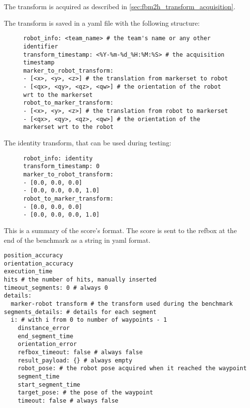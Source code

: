 \documentclass[a4paper]{article}
\begin{document}
The transform is acquired as described in \ref{sec:fbm2h_transform_acquisition}.

The transform is saved in a yaml file with the following structure:


\begin{figure}[h!]
	\noindent
	\begin{minipage}[t!]{\linewidth}
		\begin{lstlisting}[caption=transform-<team_name>.yaml]
robot_info: <team_name> # the team's name or any other identifier
transform_timestamp: <%Y-%m-%d_%H:%M:%S> # the acquisition timestamp
marker_to_robot_transform:
- [<x>, <y>, <z>] # the translation from markerset to robot
- [<qx>, <qy>, <qz>, <qw>] # the orientation of the robot wrt to the markerset
robot_to_marker_transform:
- [<x>, <y>, <z>] # the translation from robot to markerset
- [<qx>, <qy>, <qz>, <qw>] # the orientation of the markerset wrt to the robot
    \end{lstlisting}
	\end{minipage}
\end{figure}


The identity transform, that can be used during testing:
\begin{figure}[h!]
	\noindent
	\begin{minipage}[t!]{\linewidth}
		\begin{lstlisting}[caption=transform-identity.yaml]
robot_info: identity
transform_timestamp: 0
marker_to_robot_transform:
- [0.0, 0.0, 0.0]
- [0.0, 0.0, 0.0, 1.0]
robot_to_marker_transform:
- [0.0, 0.0, 0.0]
- [0.0, 0.0, 0.0, 1.0]
    \end{lstlisting}
	\end{minipage}
\end{figure}


\label{sec:fbm2h_score_data_format}

This is a summary of the score's format.
The score is sent to the refbox at the end of the benchmark as a string in yaml format.

\begin{verbatim}
position_accuracy
orientation_accuracy
execution_time
hits # the number of hits, manually inserted
timeout_segments: 0 # always 0
details:
  marker-robot transform # the transform used during the benchmark
segments_details: # details for each segment
  i: # with i from 0 to number of waypoints - 1
    dinstance_error
    end_segment_time
    orientation_error
    refbox_timeout: false # always false
    result_payload: {} # always empty
    robot_pose: # the robot pose acquired when it reached the waypoint
    segment_time
    start_segment_time
    target_pose: # the pose of the waypoint
    timeout: false # always false
\end{verbatim} 
\end{document}
